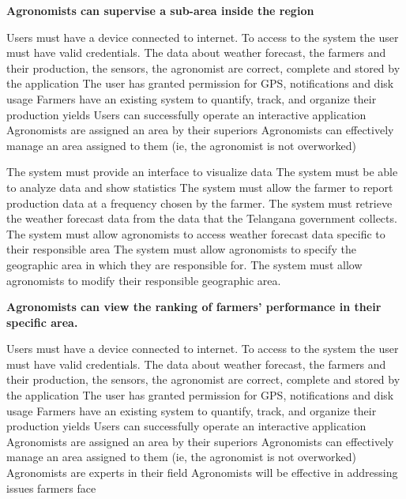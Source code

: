 \begin{itemize}
 \textbf{Agronomists can supervise a sub-area inside the region}
\begin{itemize}
  Users must have a device connected to internet.
 To access to the system the user must have valid credentials.
 The data about weather forecast, the farmers and their production, the sensors, the agronomist are correct, complete and stored by the application
 The user has granted permission for GPS, notifications and disk usage
 Farmers have an existing system to quantify, track, and organize their production yields
 Users can successfully operate an interactive application
 Agronomists are assigned an area by their superiors
 Agronomists can effectively manage an area assigned to them (ie, the agronomist is not overworked)

 The system must provide an interface to visualize data
 The system must be able to analyze data and show statistics
 The system must allow the farmer to report production data at a frequency chosen by the farmer.
 The system must retrieve the weather forecast data from the data that the Telangana government collects.
 The system must allow agronomists to access weather forecast data specific to their responsible area
 The system must allow agronomists to specify the geographic area in which they are responsible for.
 The system must allow agronomists to modify their responsible geographic area.
\end{itemize}

 \textbf{Agronomists can view the ranking of farmers’ performance in their specific area.}
\begin{itemize}
  Users must have a device connected to internet.
 To access to the system the user must have valid credentials.
 The data about weather forecast, the farmers and their production, the sensors, the agronomist are correct, complete and stored by the application
 The user has granted permission for GPS, notifications and disk usage
 Farmers have an existing system to quantify, track, and organize their production yields
 Users can successfully operate an interactive application
 Agronomists are assigned an area by their superiors
 Agronomists can effectively manage an area assigned to them (ie, the agronomist is not overworked)
 Agronomists are experts in their field
 Agronomists will be effective in addressing issues farmers face



\end{itemize}
\end{itemize}
